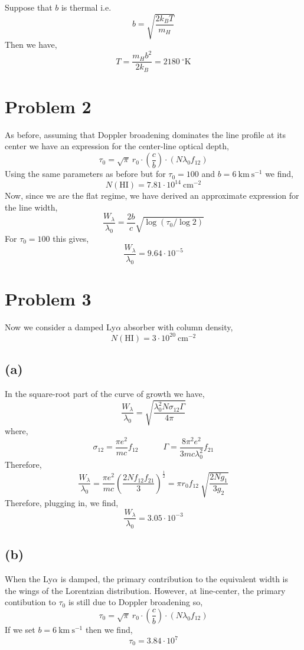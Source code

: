 \documentclass[12pt]{article}
\begin{document}
Suppose that $b$ is thermal i.e.
\[ b = \sqrt{\frac{2 k_B T}{m_H}} \]
Then we have,
\[ T = \frac{m_H b^2}{2 k_B} = 2 180 \:^\circ \mathrm{K} \]

\section{Problem 2}

As before, assuming that Doppler broadening dominates the line profile at its center we have an expression for the center-line optical depth,
\[ \tau_0 = \sqrt{\pi} \: r_0 \cdot \left( \frac{c}{b} \right) \cdot (N \lambda_0 f_{12}) \]
Using the same parameters as before but for $\tau_0 = 100$ and $b = 6 \: \mathrm{km} \: \mathrm{s}^{-1}$ we find,
\[ N(\mathrm{HI}) = 7.81 \cdot 10^{14} \: \mathrm{cm}^{-2} \]
Now, since we are the flat regime, we have derived an approximate expression for the line width,
\[ \frac{W_\lambda}{\lambda_0} = \frac{2 b}{c} \sqrt{\log{(\tau_0 / \log{2})}} \]
For $\tau_0 = 100$ this gives,
\[ \frac{W_{\lambda}}{\lambda_0} = 9.64 \cdot 10^{-5} \]
 

\section{Problem 3}

Now we consider a damped Ly$\alpha$ absorber with column density,
\[ N(\mathrm{HI}) = 3 \cdot 10^{20} \: \mathrm{cm}^{-2} \]

\subsection{(a)}

In the square-root part of the curve of growth we have,
\[ \frac{W_\lambda}{\lambda_0} = \sqrt{ \frac{\lambda_0^2 N \sigma_{12} \Gamma}{4 \pi}} \]
where,
\[ \sigma_{12} = \frac{\pi e^2}{m c} f_{12} \quad \quad \quad \Gamma = \frac{8 \pi^2 e^2}{3 m c \lambda_0^2} f_{21}   \]
Therefore,
\[ \frac{W_\lambda}{\lambda_0} = \frac{\pi e^2}{mc} \left( \frac{2 N f_{12} f_{21}}{3}  \right)^{\frac{1}{2}} = \pi r_0 f_{12} \: \sqrt{\frac{2 N g_1}{3 g_2}} \]
Therefore, plugging in, we find,
\[ \frac{W_\lambda}{\lambda_0} = 3.05 \cdot 10^{-3} \]

\subsection{(b)}

When the Ly$\alpha$ is damped, the primary contribution to the equivalent width is the wings of the Lorentzian distribution. However, at line-center, the primary contibution to $\tau_0$ is still due to Doppler broadening so,
\[ \tau_0 = \sqrt{\pi} \: r_0 \cdot \left( \frac{c}{b} \right) \cdot (N \lambda_0 f_{12}) \]
If we set $b = 6 \: \mathrm{km} \: \mathrm{s}^{-1}$ then we find,
\[ \tau_0 = 3.84 \cdot 10^{7} \]
\end{document}
